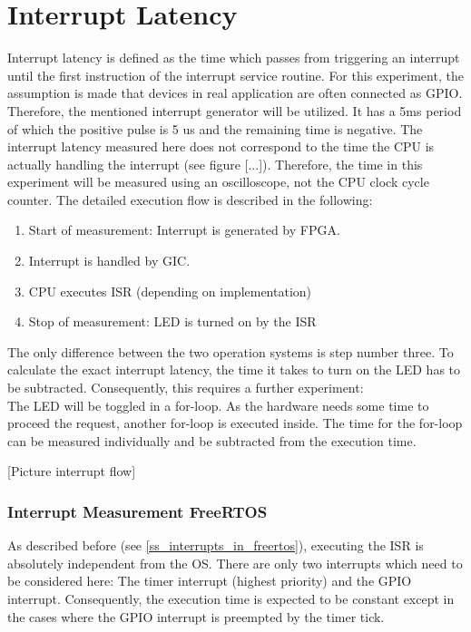 \section{Interrupt Latency}
Interrupt latency is defined as the time which passes from triggering an interrupt until the first instruction of the interrupt service routine. 
For this  experiment, the assumption is made that devices in real application are often connected as \ac{GPIO}.
Therefore, the mentioned interrupt generator will be utilized.
It has a 5ms period of which the positive pulse is 5 us and the remaining time is negative.
The interrupt latency measured here does not correspond to the time the \ac{CPU} is actually handling the interrupt (see figure [...]).
Therefore, the time in this experiment will be measured using an oscilloscope, not the \ac{CPU} clock cycle counter.
The detailed execution flow is described in the following:
\begin{enumerate}
	\item Start of measurement: Interrupt is generated by \ac{FPGA}.
	\item Interrupt is handled by \ac{GIC}.
	\item \ac{CPU} executes \ac{ISR} (depending on implementation)
	\item Stop of measurement: \ac{LED} is turned on by the \ac{ISR}
\end{enumerate}
The only difference between the two operation systems is step number three. 
To calculate the exact interrupt latency, the time it takes to turn on the \ac{LED} has to be subtracted.
Consequently, this requires a further experiment:\\
The \ac{LED} will be toggled in a for-loop.
As the hardware needs some time to proceed the request, another for-loop is executed inside.
The time for the for-loop can be measured individually and be subtracted from the execution time.

[Picture interrupt flow]

\subsubsection{Interrupt Measurement FreeRTOS}
As described before (see \ref{ss_interrupts_in_freertos}), executing the \ac{ISR} is absolutely independent from the \ac{OS}.
There are only two interrupts which need to be considered here: The timer interrupt (highest priority) and the \ac{GPIO} interrupt.
Consequently, the execution time is expected to be constant except in the cases where the \ac{GPIO} interrupt is preempted by the timer tick.


